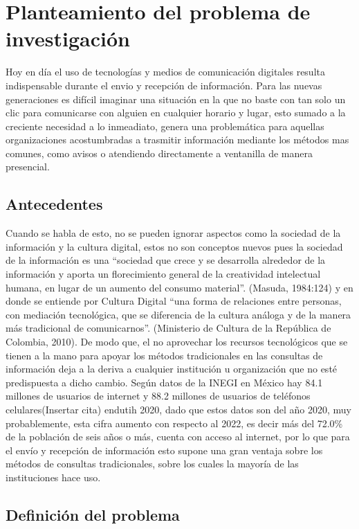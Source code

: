 \chapter{Planteamiento del problema de investigación}

Hoy en día el uso de tecnologías y medios de comunicación digitales resulta indispensable durante el envio y recepción de información. Para las nuevas generaciones es difícil imaginar una situación en la que no baste con tan solo un clic para comunicarse con alguien en cualquier horario y lugar, esto sumado a la creciente necesidad a lo inmeadiato, genera una problemática para aquellas organizaciones acostumbradas a trasmitir información mediante los métodos mas comunes, como avisos o atendiendo directamente a ventanilla de manera presencial. 

\section{Antecedentes}

Cuando se habla de esto, no se pueden ignorar aspectos como la sociedad de la información y la cultura digital, estos no son conceptos nuevos pues la sociedad de la información es una “sociedad que crece y se desarrolla alrededor de la información y aporta un florecimiento general de la creatividad intelectual humana, en lugar de un aumento del consumo material”. (Masuda, 1984:124) y en donde se entiende por Cultura Digital “una forma de relaciones entre personas, con mediación tecnológica, que se diferencia de la cultura análoga y de la manera más tradicional de comunicarnos”. (Ministerio de Cultura de la República de Colombia, 2010).
De modo que, el no aprovechar los recursos tecnológicos que se tienen a la mano para apoyar los métodos tradicionales en las consultas de información deja a la deriva a cualquier institución u organización que no esté predispuesta a dicho cambio.
Según datos de la INEGI en México hay 84.1 millones de usuarios de internet y 88.2 millones de usuarios de teléfonos celulares(Insertar cita) endutih 2020, dado que estos datos son del año 2020, muy probablemente, esta cifra aumento con respecto al 2022, es decir más del 72.0\% de la población de seis años o más, cuenta con acceso al internet, por lo que para el envío y recepción de información esto supone una gran ventaja sobre los métodos de consultas tradicionales, sobre los cuales la mayoría de las instituciones hace uso.


\section{Definición del problema}

